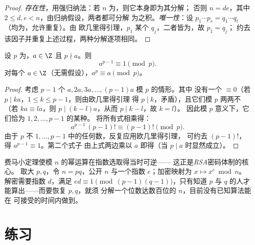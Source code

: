 \begin{proof}
\emph{存在性}，用强归纳法：若 $n$ 为，则它本身即为其分解；
否则 $n = de$，其中 $2 \leq d, e < n$，由归纳假设，两者都可分解
为之积。\emph{唯一性}：设
$p_1\cdots p_s = q_1 \cdots q_t$（均为，允许重复）。由
欧几里得引理，$p_1$ 某个 $q_j$，二者皆为，故 $p_1 = q_j$；
约去该因子并重复上述过程，两种分解逐项相同。
\end{proof}

\begin{theorem}[费马小定理]\label{thm:g12:arith:fermat}
设 $p$ 为，$a \in \Z$ 且 $p \nmid a$。则
\[
a^{p-1} \equiv 1 \pmod p .
\]
对每个 $a \in \Z$（无需假设），$a^p \equiv a \pmod p$。
\end{theorem}

\begin{proof}
考虑 $p - 1$ 个 $a, 2a, 3a, \dots, (p-1)a$ 模 $p$ 的情形。其中
没有一个 $\equiv 0$（若 $p \mid ka$，$1 \leq k \leq p-1$，则由欧几里得引理
得 $p \mid k$，矛盾），且它们模 $p$ 两两不（若
$ka \equiv la$，则 $p \mid (k - l)a$，从而 $p \mid k - l$，故 $k = l$）。
因此模 $p$ 意义下，它们恰为 $1, 2, \dots, p-1$ 的某种。
将所有式相乘得：
\[
a^{p-1}\,(p-1)! \equiv (p-1)! \pmod p .
\]
由于 $p$ 不 $1, \dots, p-1$ 中的任何数，反复应用欧几里得引理，
可约去 $(p-1)!$，得 $a^{p-1} \equiv 1$。第二个式子
由上式两边乘以 $a$ 即得（当 $p \mid a$ 时显然成立）。
\end{proof}

\begin{example}[密码学应用]\label{ex:g12:arith:rsa}
费马小定理使模 $n$ 的幂运算在指数选取得当时可逆——
这正是\emph{RSA}密码体制的核心。
取大 $p, q$，令 $n = pq$，公开 $n$ 与一个指数
$e$；加密映射为 $x \mapsto x^e \bmod n$。解密需要指数
$d$，满足 $ed \equiv 1 \pmod{(p-1)(q-1)}$，只有知道 $p$
与 $q$ 的人才能算出——而要恢复 $p, q$，就须
分解一个位数达数百位的 $n$，目前没有已知算法能在
可接受的时间内做到。
\end{example}

\section{练习}

